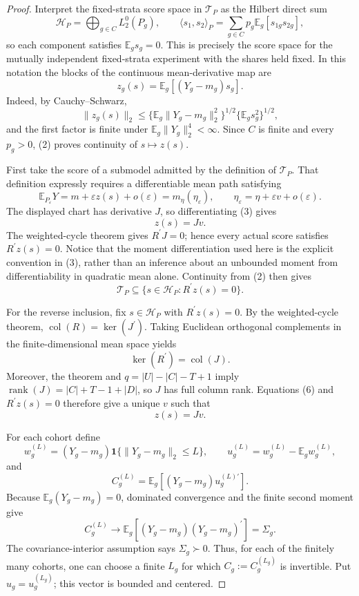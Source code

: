 \documentclass{article}
\begin{document}
\begin{proof}
Interpret the fixed-strata score space in \(\mathcal T_P\) as the Hilbert direct sum
\[
\mathcal H_P=\bigoplus_{g\in C}L_2^0(P_g),
\qquad
\langle s_1,s_2\rangle_P
=\sum_{g\in C}p_g\mathbb E_g[s_{1g}s_{2g}],
\]
so each component satisfies \(\mathbb E_gs_g=0\).  This is precisely the score space for the mutually independent fixed-strata experiment with the shares held fixed.  In this notation the blocks of the continuous mean-derivative map are
\[
z_g(s)=\mathbb E_g[(Y_g-m_g)s_g].                                      \tag{1}
\]
Indeed, by Cauchy--Schwarz,
\[
\|z_g(s)\|_2
\le \{\mathbb E_g\|Y_g-m_g\|_2^2\}^{1/2}
     \{\mathbb E_gs_g^2\}^{1/2},                                      \tag{2}
\]
and the first factor is finite under \(\mathbb E_g\|Y_g\|_2^4<\infty\).  Since \(C\) is finite and every \(p_g>0\), (2) proves continuity of \(s\mapsto z(s)\).

First take the score of a submodel admitted by the definition of \(\mathcal T_P\).  That definition expressly requires a differentiable mean path satisfying
\[
\mathbb E_{P_\varepsilon}Y
=m+\varepsilon z(s)+o(\varepsilon)
=m_\eta(\eta_\varepsilon),
\qquad
\eta_\varepsilon=\eta+\varepsilon v+o(\varepsilon).                   \tag{3}
\]
The displayed chart has derivative \(J\), so differentiating (3) gives
\[
z(s)=Jv.                                                               \tag{4}
\]
The weighted-cycle theorem gives \(R^{\prime}J=0\); hence every actual score satisfies \(R^{\prime}z(s)=0\).  Notice that the moment differentiation used here is the explicit convention in (3), rather than an inference about an unbounded moment from differentiability in quadratic mean alone.  Continuity from (2) then gives
\[
\mathcal T_P\subseteq\{s\in\mathcal H_P:R^{\prime}z(s)=0\}.           \tag{5}
\]

For the reverse inclusion, fix \(s\in\mathcal H_P\) with \(R^{\prime}z(s)=0\).  By the weighted-cycle theorem,
\(\operatorname{col}(R)=\ker(J^{\prime})\).  Taking Euclidean orthogonal complements in the finite-dimensional mean space yields
\[
\ker(R^{\prime})=\operatorname{col}(J).                                \tag{6}
\]
Moreover, the theorem and \(q=|U|-|C|-T+1\) imply
\(\operatorname{rank}(J)=|C|+T-1+|D|\), so \(J\) has full column rank.  Equations (6) and \(R^{\prime}z(s)=0\) therefore give a unique \(v\) such that
\[
z(s)=Jv.                                                               \tag{7}
\]

For each cohort define
\[
w_g^{(L)}=(Y_g-m_g)\mathbf 1\{\|Y_g-m_g\|_2\le L\},
\qquad
u_g^{(L)}=w_g^{(L)}-\mathbb E_gw_g^{(L)},
\]
and
\[
C_g^{(L)}=\mathbb E_g[(Y_g-m_g)u_g^{(L)\prime}].                        \tag{8}
\]
Because \(\mathbb E_g(Y_g-m_g)=0\), dominated convergence and the finite second moment give
\[
C_g^{(L)}\longrightarrow
\mathbb E_g[(Y_g-m_g)(Y_g-m_g)^{\prime}]=\Sigma_g.                     \tag{9}
\]
The covariance-interior assumption says \(\Sigma_g\succ0\).  Thus, for each of the finitely many cohorts, one can choose a finite \(L_g\) for which
\(C_g:=C_g^{(L_g)}\) is invertible.  Put \(u_g=u_g^{(L_g)}\); this vector is bounded and centered.


\end{proof}
\end{document}
